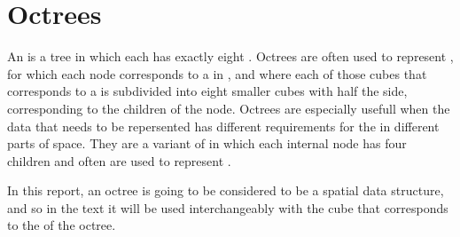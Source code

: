 \chapter{Octrees}

An \octree is a tree  in which each  has exactly eight . Octrees are often used to represent , for which each node corresponds to a \cube in , and where each of those cubes that corresponds to a  is subdivided into eight smaller cubes with half the side, corresponding to the children of the node. Octrees are especially usefull when the data that needs to be repersented has different requirements for the \LOD in different parts of space. They are a variant of \quadtrees in which each internal node has four children and often are used to represent .

In this report, an octree is going to be considered to be a spatial data structure, and so in the text it will be used interchangeably with the cube that corresponds to the  of the octree.

